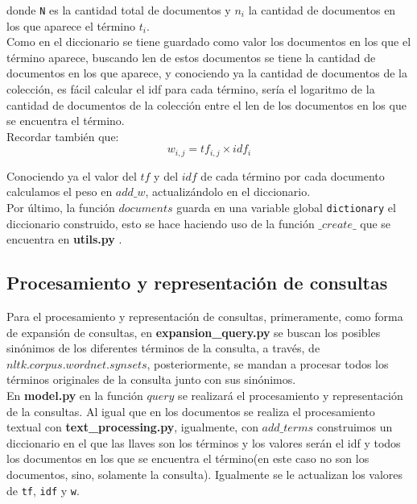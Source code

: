 \documentclass{llncs}
\begin{document}
donde \texttt{N} es la cantidad total de documentos y \texttt{$n_i$} la cantidad de documentos en los que aparece el t\'ermino \texttt{$t_i$}.\\                                                                      

Como en el diccionario se tiene guardado como valor los documentos en los que el t\'ermino aparece, buscando len de estos documentos se tiene la cantidad de documentos en los que aparece, y conociendo ya la cantidad de documentos de la colecci\'on, es f\'acil calcular el idf para cada t\'ermino, ser\'ia el logaritmo de la cantidad de documentos de la colecci\'on entre el len de los documentos en los que se encuentra el t\'ermino.\\

Recordar tambi\'en que:\\

\begin{equation}
	w_{i,j} = tf_{i,j} \times idf_i
\end{equation}


Conociendo ya el valor del $tf$ y del $idf$ de cada t\'ermino por cada documento calculamos el peso en $add\_w$, actualiz\'andolo en el diccionario.\\

Por \'ultimo, la funci\'on $documents$ guarda en una variable global \texttt{dictionary} el diccionario construido, esto se hace haciendo uso de la funci\'on $\_create\_$ que se encuentra en \textbf{utils.py} .\\

\subsection{Procesamiento y representaci\'on de consultas}
Para el procesamiento y representaci\'on de consultas, primeramente, como forma de expansi\'on de consultas, en \textbf{expansion\_query.py} se buscan los posibles sin\'onimos de los diferentes t\'erminos de la consulta, a trav\'es, de $nltk.corpus.wordnet.synsets$, posteriormente, se mandan a procesar todos los t\'erminos originales de la consulta junto con sus sin\'onimos.\\

En \textbf{model.py} en la funci\'on $query$ se realizar\'a el procesamiento y representaci\'on de la consultas. Al igual que en los documentos se realiza el procesamiento textual con \textbf{text\_processing.py}, igualmente, con $add\_terms$ construimos un diccionario en el que las llaves son los t\'erminos y los valores ser\'an el idf y todos los documentos en los que se encuentra el t\'ermino(en este caso no son los documentos, sino, solamente la consulta). Igualmente se le actualizan los valores de \texttt{tf}, \texttt{idf} y \texttt{w}.\\
\end{document}
